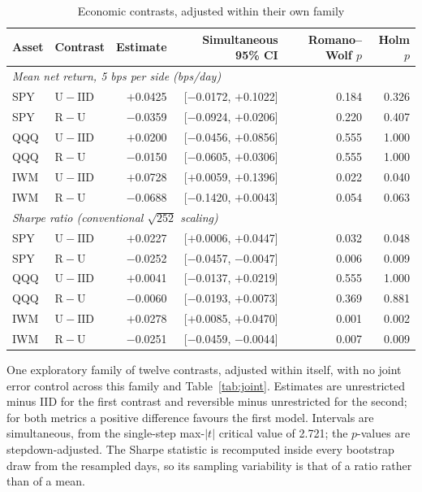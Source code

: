 \begin{table}[!htbp]\centering\small\setlength{\tabcolsep}{5pt}
\caption{Economic contrasts, adjusted within their own family}\label{tab:jointecon}
\footnotesize\begin{tabular}{llrrrr}\toprule
Asset & Contrast & Estimate & Simultaneous 95\% CI & Romano--Wolf $p$ & Holm $p$\\\midrule
\multicolumn{6}{l}{\emph{Mean net return, 5 bps per side (bps/day)}}\\
\addlinespace[2pt]
SPY & $\mathrm{U}-\mathrm{IID}$ & $+$0.0425 & [$-$0.0172, $+$0.1022] & 0.184 & 0.326\\
SPY & $\mathrm{R}-\mathrm{U}$ & $-$0.0359 & [$-$0.0924, $+$0.0206] & 0.220 & 0.407\\
QQQ & $\mathrm{U}-\mathrm{IID}$ & $+$0.0200 & [$-$0.0456, $+$0.0856] & 0.555 & 1.000\\
QQQ & $\mathrm{R}-\mathrm{U}$ & $-$0.0150 & [$-$0.0605, $+$0.0306] & 0.555 & 1.000\\
IWM & $\mathrm{U}-\mathrm{IID}$ & $+$0.0728 & [$+$0.0059, $+$0.1396] & 0.022 & 0.040\\
IWM & $\mathrm{R}-\mathrm{U}$ & $-$0.0688 & [$-$0.1420, $+$0.0043] & 0.054 & 0.063\\
\midrule
\multicolumn{6}{l}{\emph{Sharpe ratio (conventional $\sqrt{252}$ scaling)}}\\
\addlinespace[2pt]
SPY & $\mathrm{U}-\mathrm{IID}$ & $+$0.0227 & [$+$0.0006, $+$0.0447] & 0.032 & 0.048\\
SPY & $\mathrm{R}-\mathrm{U}$ & $-$0.0252 & [$-$0.0457, $-$0.0047] & 0.006 & 0.009\\
QQQ & $\mathrm{U}-\mathrm{IID}$ & $+$0.0041 & [$-$0.0137, $+$0.0219] & 0.555 & 1.000\\
QQQ & $\mathrm{R}-\mathrm{U}$ & $-$0.0060 & [$-$0.0193, $+$0.0073] & 0.369 & 0.881\\
IWM & $\mathrm{U}-\mathrm{IID}$ & $+$0.0278 & [$+$0.0085, $+$0.0470] & 0.001 & 0.002\\
IWM & $\mathrm{R}-\mathrm{U}$ & $-$0.0251 & [$-$0.0459, $-$0.0044] & 0.007 & 0.009\\
\bottomrule\end{tabular}
\par\smallskip\parbox{0.98\linewidth}{\footnotesize One exploratory family of twelve contrasts, adjusted within itself, with no joint error control across this family and Table~\ref{tab:joint}. Estimates are unrestricted minus IID for the first contrast and reversible minus unrestricted for the second; for both metrics a positive difference favours the first model. Intervals are simultaneous, from the single-step max-$|t|$ critical value of 2.721; the $p$-values are stepdown-adjusted. The Sharpe statistic is recomputed inside every bootstrap draw from the resampled days, so its sampling variability is that of a ratio rather than of a mean.}
\end{table}
